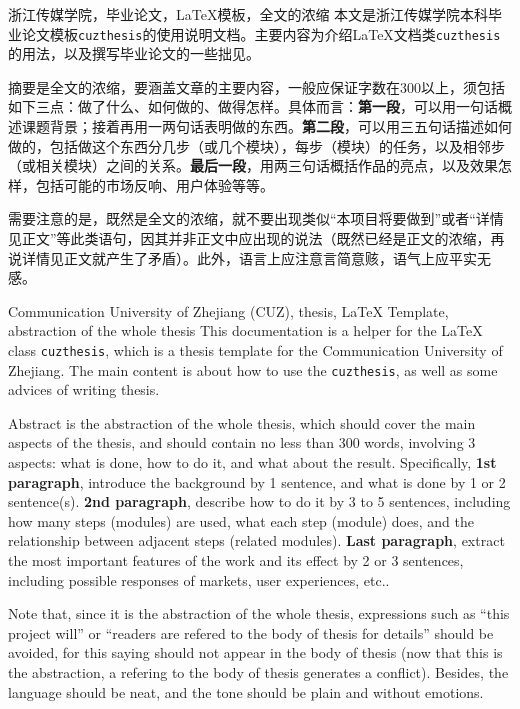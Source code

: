 \begin{chineseabstract}
    {浙江传媒学院，毕业论文，\LaTeX{}模板，全文的浓缩}
    本文是浙江传媒学院本科毕业论文模板\texttt{cuzthesis}的使用说明文档。主要内容为介绍\LaTeX{}文档类\texttt{cuzthesis}的用法，以及撰写毕业论文的一些拙见。

    摘要是全文的浓缩，要涵盖文章的主要内容，一般应保证字数在300以上，须包括如下三点：做了什么、如何做的、做得怎样。具体而言：\textbf{第一段}，可以用一句话概述课题背景；接着再用一两句话表明做的东西。\textbf{第二段}，可以用三五句话描述如何做的，包括做这个东西分几步（或几个模块），每步（模块）的任务，以及相邻步（或相关模块）之间的关系。\textbf{最后一段}，用两三句话概括作品的亮点，以及效果怎样，包括可能的市场反响、用户体验等等。
    
    需要注意的是，既然是全文的浓缩，就不要出现类似“本项目将要做到”或者“详情见正文”等此类语句，因其并非正文中应出现的说法（既然已经是正文的浓缩，再说详情见正文就产生了矛盾）。此外，语言上应注意言简意赅，语气上应平实无感。
\end{chineseabstract}
\begin{englishabstract}
    {Communication University of Zhejiang (CUZ), thesis, \LaTeX{} Template, abstraction of the whole thesis}
    This documentation is a helper for the \LaTeX{} class \texttt{cuzthesis}, which is a thesis template for the Communication University of Zhejiang. The main content is about how to use the \texttt{cuzthesis}, as well as some advices of writing thesis.

    Abstract is the abstraction of the whole thesis, which should cover the main aspects of the thesis, and should contain no less than 300 words, involving 3 aspects: what is done, how to do it, and what about the result. Specifically, \textbf{1st paragraph}, introduce the background by 1 sentence, and what is done by 1 or 2 sentence(s). \textbf{2nd paragraph}, describe how to do it by 3 to 5 sentences, including how many steps (modules) are used, what each step (module) does, and the relationship between adjacent steps (related modules). \textbf{Last paragraph}, extract the most important features of the work and its effect by 2 or 3 sentences, including possible responses of markets, user experiences, etc..
	
	Note that, since it is the abstraction of the whole thesis, expressions such as ``this project will'' or ``readers are refered to the body of thesis for details'' should be avoided, for this saying should not appear in the body of thesis (now that this is the abstraction, a refering to the body of thesis generates a conflict). Besides, the language should be neat, and the tone should be plain and without emotions.
\end{englishabstract}